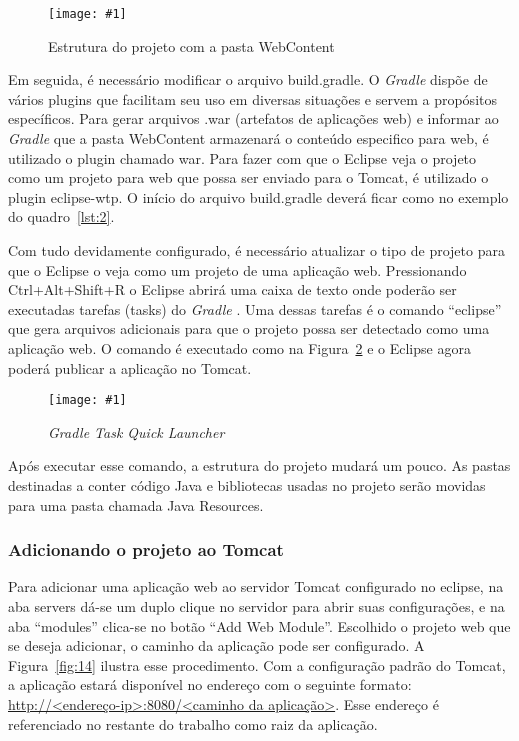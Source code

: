 \documentclass[a4paper,12pt]{article}
\newcommand{\figura}[3] {
	\begin{figure}[ht]
		\centering
		\texttt{[image: \#1]}
		\caption{#2}
		\label{#3}
	\end{figure}
	\FloatBarrier
}
\newcommand{\est}[1] {
	\textit{#1}
}
\newcommand{\groovycode}[3] {
	\setstretch{1.2}
	
	\setstretch{1.5}
}
\begin{document}
\figura{prrojetocomweninf.png}{Estrutura do projeto com a pasta WebContent}{fig:12}

Em seguida, é necessário modificar o arquivo build.gradle. O \est{Gradle} dispõe de vários plugins que facilitam seu uso em diversas situações e servem a propósitos específicos. Para gerar arquivos .war (artefatos de aplicações web) e informar ao \est{Gradle} que a pasta WebContent armazenará o conteúdo especifico para web, é utilizado o plugin chamado war. Para fazer com que o Eclipse veja o projeto como um projeto para web que possa ser enviado para o Tomcat, é utilizado o plugin eclipse-wtp. O início do arquivo build.gradle deverá ficar como no exemplo do quadro~\ref{lst:2}.

\groovycode{code/newgradle.txt}{Arquivo build.gradle com novos plugins}{lst:2}

Com tudo devidamente configurado, é necessário atualizar o tipo de projeto para que o Eclipse o veja como um projeto de uma aplicação web. Pressionando Ctrl+Alt+Shift+R o Eclipse abrirá uma caixa de texto onde poderão ser executadas tarefas (tasks) do \est{Gradle}. Uma dessas tarefas é o comando “eclipse” que gera arquivos adicionais para que o projeto possa ser detectado como uma aplicação web. O comando é executado como na Figura~\ref{fig:13} e o Eclipse agora poderá publicar a aplicação no Tomcat.

\figura{gradlecommand.png}{\est{Gradle Task Quick Launcher}}{fig:13}

Após executar esse comando, a estrutura do projeto mudará um pouco. As pastas destinadas a conter código Java e bibliotecas usadas no projeto serão movidas para uma pasta chamada Java Resources.

\subsubsection{Adicionando o projeto ao Tomcat}

Para adicionar uma aplicação web ao servidor Tomcat configurado no eclipse, na aba servers dá-se um duplo clique no servidor para abrir suas configurações, e na aba “modules” clica-se no botão “Add Web Module”. Escolhido o projeto web que se deseja adicionar, o caminho da aplicação pode ser configurado. A Figura~\ref{fig:14} ilustra esse procedimento. Com a configuração padrão do Tomcat, a aplicação estará disponível no endereço com o seguinte formato: \url{http://<endereço-ip>:8080/<caminho da aplicação>}. Esse endereço é referenciado no restante do trabalho como raiz da aplicação.
\end{document}
